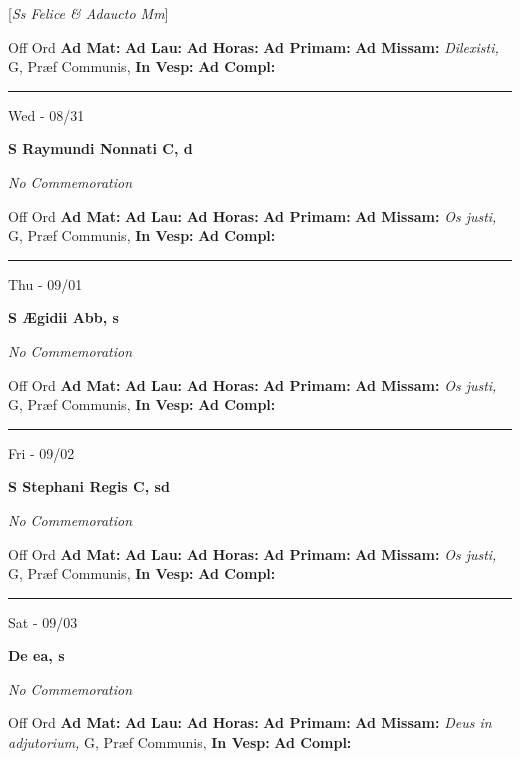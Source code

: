\documentclass[letterpaper, 10pt]{article}
\begin{document}
[\textit{Ss Felice \& Adaucto Mm}]
\begin{justify}
Off Ord
\textbf{Ad Mat: }
\textbf{Ad Lau: }
\textbf{Ad Horas: }
\textbf{Ad Primam: }
\textbf{Ad Missam:} \textit{Dilexisti, } G, Præf Communis, 
\textbf{In Vesp: }
\textbf{Ad Compl: }\end{justify}



\hrule
\begin{center}
Wed - 08/31
\end{center}\textbf{ \large S Raymundi Nonnati C, \textnormal{\normalsize d}}

\textit{No Commemoration}\begin{justify}
Off Ord
\textbf{Ad Mat: }
\textbf{Ad Lau: }
\textbf{Ad Horas: }
\textbf{Ad Primam: }
\textbf{Ad Missam:} \textit{Os justi, } G, Præf Communis, 
\textbf{In Vesp: }
\textbf{Ad Compl: }\end{justify}



\hrule
\begin{center}
Thu - 09/01
\end{center}\textbf{ \large S Ægidii Abb, \textnormal{\normalsize s}}

\textit{No Commemoration}\begin{justify}
Off Ord
\textbf{Ad Mat: }
\textbf{Ad Lau: }
\textbf{Ad Horas: }
\textbf{Ad Primam: }
\textbf{Ad Missam:} \textit{Os justi, } G, Præf Communis, 
\textbf{In Vesp: }
\textbf{Ad Compl: }\end{justify}



\hrule
\begin{center}
Fri - 09/02
\end{center}\textbf{ \large S Stephani Regis C, \textnormal{\normalsize sd}}

\textit{No Commemoration}\begin{justify}
Off Ord
\textbf{Ad Mat: }
\textbf{Ad Lau: }
\textbf{Ad Horas: }
\textbf{Ad Primam: }
\textbf{Ad Missam:} \textit{Os justi, } G, Præf Communis, 
\textbf{In Vesp: }
\textbf{Ad Compl: }\end{justify}



\hrule
\begin{center}
Sat - 09/03
\end{center}\textbf{ \large De ea, \textnormal{\normalsize s}}

\textit{No Commemoration}\begin{justify}
Off Ord
\textbf{Ad Mat: }
\textbf{Ad Lau: }
\textbf{Ad Horas: }
\textbf{Ad Primam: }
\textbf{Ad Missam:} \textit{Deus in adjutorium, } G, Præf Communis, 
\textbf{In Vesp: }
\textbf{Ad Compl: }\end{justify}
\end{document}
